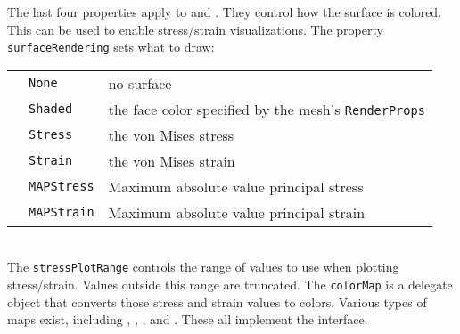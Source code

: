 The last four properties apply to 
 and 
.
They control how the surface is colored.  This can be used to enable stress/strain
visualizations.  The property {\tt surfaceRendering} sets what to draw:\\
\medskip
\begin{tabular}{lll}
& {\tt None} & no surface\\
& {\tt Shaded} & the face color specified by the mesh's {\tt RenderProps}\\
& {\tt Stress} & the von Mises stress\\
& {\tt Strain} & the von Mises strain\\
& {\tt MAPStress} & Maximum absolute value principal stress\\
& {\tt MAPStrain} & Maximum absolute value principal strain
\end{tabular}
\medskip\\
The {\tt stressPlotRange} controls the range of values to use when plotting 
stress/strain.  Values outside this range are truncated.  The {\tt colorMap}
is a delegate object that converts those stress and strain values to colors.
Various types of maps exist, including 
,
,
, and
.  These all implement the
 interface.

